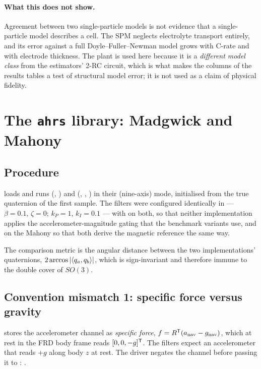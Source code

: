 \paragraph{What this does not show.} Agreement between two single-particle models is not evidence
that a single-particle model describes a cell. The SPM neglects electrolyte transport entirely, and
its error against a full Doyle--Fuller--Newman model grows with C-rate and with electrode thickness.
The plant is used here because it is a \emph{different model class} from the estimators' 2-RC
circuit, which is what makes the  columns of the results tables a test of structural
model error; it is not used as a claim of physical fidelity.

\section{The \texttt{ahrs} library: Madgwick and Mahony}

\subsection{Procedure}

 loads  and runs
 (, ) and
 (, , ) in their  (nine-axis)
mode, initialised from the true quaternion of the first sample. The  filters were
configured identically in  --- $\beta = 0.1$, $\zeta = 0$;
$k_P = 1$, $k_I = 0.1$ --- with  on both, so that neither implementation
applies the accelerometer-magnitude gating that the benchmark variants use, and
 on the Mahony so that both derive the magnetic reference the
same way.

The comparison metric is the angular distance between the two implementations' quaternions,
$2\arccos\left\lvert \langle q_a, q_b\rangle \right\rvert$, which is sign-invariant and therefore immune to the double
cover of $SO(3)$.

\subsection{Convention mismatch 1: specific force versus gravity}

 stores the accelerometer channel as \emph{specific force},
$f = R^{\mathsf{T}}(a_{\text{nav}} - g_{\text{nav}})$, which at rest in the FRD body frame reads
$[0,0,-g]^{\mathsf{T}}$. The  filters expect an accelerometer that reads $+g$ along body $z$ at
rest. The driver negates the channel before passing it to :
.

